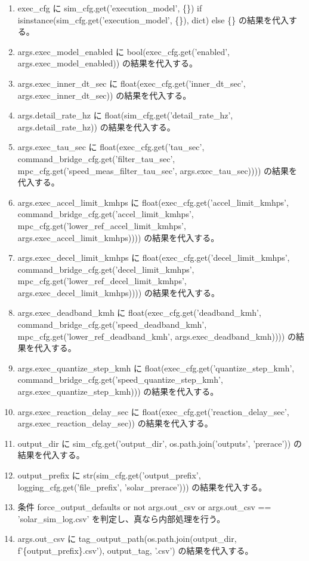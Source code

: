 \documentclass[a4paper,11pt]{article}
\begin{document}
\begin{enumerate}[leftmargin=1.8em]
\item exec\_cfg に sim\_cfg.get('execution\_model', \{\}) if isinstance(sim\_cfg.get('execution\_model', \{\}), dict) else \{\} の結果を代入する。
\item args.exec\_model\_enabled に bool(exec\_cfg.get('enabled', args.exec\_model\_enabled)) の結果を代入する。
\item args.exec\_inner\_dt\_sec に float(exec\_cfg.get('inner\_dt\_sec', args.exec\_inner\_dt\_sec)) の結果を代入する。
\item args.detail\_rate\_hz に float(sim\_cfg.get('detail\_rate\_hz', args.detail\_rate\_hz)) の結果を代入する。
\item args.exec\_tau\_sec に float(exec\_cfg.get('tau\_sec', command\_bridge\_cfg.get('filter\_tau\_sec', mpc\_cfg.get('speed\_meas\_filter\_tau\_sec', args.exec\_tau\_sec)))) の結果を代入する。
\item args.exec\_accel\_limit\_kmhps に float(exec\_cfg.get('accel\_limit\_kmhps', command\_bridge\_cfg.get('accel\_limit\_kmhps', mpc\_cfg.get('lower\_ref\_accel\_limit\_kmhps', args.exec\_accel\_limit\_kmhps)))) の結果を代入する。
\item args.exec\_decel\_limit\_kmhps に float(exec\_cfg.get('decel\_limit\_kmhps', command\_bridge\_cfg.get('decel\_limit\_kmhps', mpc\_cfg.get('lower\_ref\_decel\_limit\_kmhps', args.exec\_decel\_limit\_kmhps)))) の結果を代入する。
\item args.exec\_deadband\_kmh に float(exec\_cfg.get('deadband\_kmh', command\_bridge\_cfg.get('speed\_deadband\_kmh', mpc\_cfg.get('lower\_ref\_deadband\_kmh', args.exec\_deadband\_kmh)))) の結果を代入する。
\item args.exec\_quantize\_step\_kmh に float(exec\_cfg.get('quantize\_step\_kmh', command\_bridge\_cfg.get('speed\_quantize\_step\_kmh', args.exec\_quantize\_step\_kmh))) の結果を代入する。
\item args.exec\_reaction\_delay\_sec に float(exec\_cfg.get('reaction\_delay\_sec', args.exec\_reaction\_delay\_sec)) の結果を代入する。
\item output\_dir に sim\_cfg.get('output\_dir', os.path.join('outputs', 'prerace')) の結果を代入する。
\item output\_prefix に str(sim\_cfg.get('output\_prefix', logging\_cfg.get('file\_prefix', 'solar\_prerace'))) の結果を代入する。
\item 条件 force\_output\_defaults or not args.out\_csv or args.out\_csv == 'solar\_sim\_log.csv' を判定し、真なら内部処理を行う。
\item   args.out\_csv に tag\_output\_path(os.path.join(output\_dir, f'\{output\_prefix\}.csv'), output\_tag, '.csv') の結果を代入する。

\end{enumerate}
\end{document}
